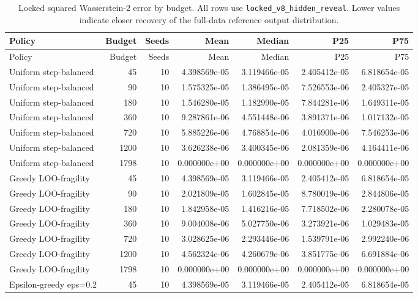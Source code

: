 \begin{scriptsize}
\begin{longtable}{lrrrrrr}
\caption{Locked squared Wasserstein-2 error by budget. All rows use \texttt{locked\_v8\_hidden\_reveal}. Lower values indicate closer recovery of the full-data reference output distribution.}\label{tab:error-by-budget}\\
\toprule
Policy & Budget & Seeds & Mean & Median & P25 & P75 \\
\midrule
\endfirsthead
\toprule
Policy & Budget & Seeds & Mean & Median & P25 & P75 \\
\midrule
\endhead
Uniform step-balanced & 45 & 10 & 4.398569e-05 & 3.119466e-05 & 2.405412e-05 & 6.818654e-05 \\
Uniform step-balanced & 90 & 10 & 1.575325e-05 & 1.386495e-05 & 7.526553e-06 & 2.405327e-05 \\
Uniform step-balanced & 180 & 10 & 1.546280e-05 & 1.182990e-05 & 7.844281e-06 & 1.649311e-05 \\
Uniform step-balanced & 360 & 10 & 9.287861e-06 & 4.551448e-06 & 3.891371e-06 & 1.017132e-05 \\
Uniform step-balanced & 720 & 10 & 5.885226e-06 & 4.768854e-06 & 4.016900e-06 & 7.546253e-06 \\
Uniform step-balanced & 1200 & 10 & 3.626238e-06 & 3.400345e-06 & 2.081359e-06 & 4.164411e-06 \\
Uniform step-balanced & 1798 & 10 & 0.000000e+00 & 0.000000e+00 & 0.000000e+00 & 0.000000e+00 \\
Greedy LOO-fragility & 45 & 10 & 4.398569e-05 & 3.119466e-05 & 2.405412e-05 & 6.818654e-05 \\
Greedy LOO-fragility & 90 & 10 & 2.021809e-05 & 1.602845e-05 & 8.780019e-06 & 2.844806e-05 \\
Greedy LOO-fragility & 180 & 10 & 1.842958e-05 & 1.416216e-05 & 7.718502e-06 & 2.280078e-05 \\
Greedy LOO-fragility & 360 & 10 & 9.004008e-06 & 5.027750e-06 & 3.273921e-06 & 1.029483e-05 \\
Greedy LOO-fragility & 720 & 10 & 3.028625e-06 & 2.293446e-06 & 1.539791e-06 & 2.992240e-06 \\
Greedy LOO-fragility & 1200 & 10 & 4.562324e-06 & 4.260679e-06 & 3.851775e-06 & 6.691884e-06 \\
Greedy LOO-fragility & 1798 & 10 & 0.000000e+00 & 0.000000e+00 & 0.000000e+00 & 0.000000e+00 \\
Epsilon-greedy eps=0.2 & 45 & 10 & 4.398569e-05 & 3.119466e-05 & 2.405412e-05 & 6.818654e-05 \\

\end{longtable}
\end{scriptsize}
